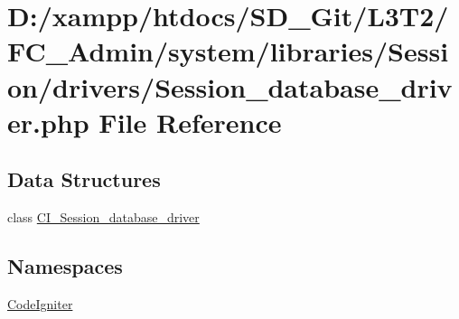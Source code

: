 \hypertarget{_admin_2system_2libraries_2_session_2drivers_2_session__database__driver_8php}{}\section{D\+:/xampp/htdocs/\+S\+D\+\_\+\+Git/\+L3\+T2/\+F\+C\+\_\+\+Admin/system/libraries/\+Session/drivers/\+Session\+\_\+database\+\_\+driver.php File Reference}
\label{_admin_2system_2libraries_2_session_2drivers_2_session__database__driver_8php}
\subsection*{Data Structures}
\begin{DoxyCompactItemize}
\item 
class \hyperlink{class_c_i___session__database__driver}{C\+I\+\_\+\+Session\+\_\+database\+\_\+driver}
\end{DoxyCompactItemize}
\subsection*{Namespaces}
\begin{DoxyCompactItemize}
\item 
 \hyperlink{namespace_code_igniter}{Code\+Igniter}
\end{DoxyCompactItemize}
